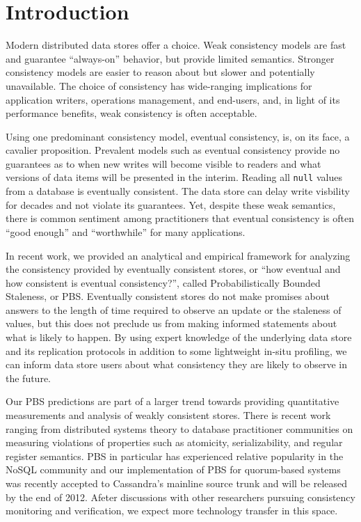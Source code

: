 \section{Introduction}

Modern distributed data stores offer a choice. Weak consistency models
are fast and guarantee ``always-on'' behavior, but provide limited
semantics. Stronger consistency models are easier to reason about but
slower and potentially unavailable. The choice of consistency has
wide-ranging implications for application writers, operations
management, and end-users, and, in light of its performance benefits,
weak consistency is often acceptable.

Using one predominant consistency model, eventual consistency, is, on
its face, a cavalier proposition. Prevalent models such as eventual
consistency provide no guarantees as to when new writes will become
visible to readers and what versions of data items will be presented
in the interim. Reading all \texttt{null} values from a database is
eventually consistent. The data store can delay write visbility for
decades and not violate its guarantees. Yet, despite these weak
semantics, there is common sentiment among practitioners that eventual
consistency is often ``good enough'' and ``worthwhile'' for many
applications.

In recent work, we provided an analytical and empirical framework for
analyzing the consistency provided by eventually consistent stores, or
``how eventual and how consistent is eventual consistency?'', called
Probabilistically Bounded Staleness, or PBS. Eventually consistent
stores do not make promises about answers to the length of time
required to observe an update or the staleness of values, but this
does not preclude us from making informed statements about what is
likely to happen. By using expert knowledge of the underlying data
store and its replication protocols in addition to some lightweight
in-situ profiling, we can inform data store users about what
consistency they are likely to observe in the future.

Our PBS predictions are part of a larger trend towards providing
quantitative measurements and analysis of weakly consistent
stores. There is recent work ranging from distributed systems theory
to database practitioner communities on measuring violations of
properties such as atomicity, serializability, and regular register
semantics. PBS in particular has experienced relative popularity in
the NoSQL community and our implementation of PBS for quorum-based
systems was recently accepted to Cassandra's mainline source trunk and
will be released by the end of 2012. Afeter discussions with other
researchers pursuing consistency monitoring and verification, we
expect more technology transfer in this space.

